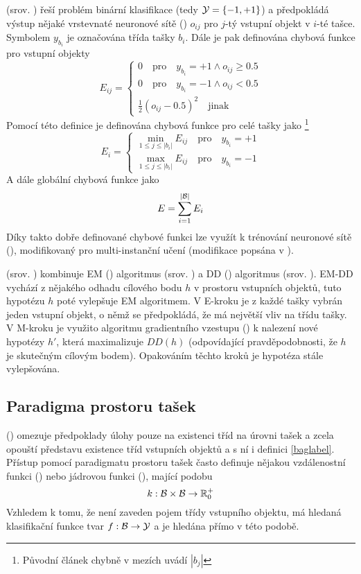  (srov. \cite{zhou_neural_2002}) řeší problém binární klasifikace (tedy \( \mathcal Y = \left\{ -1, +1 \right\} \)) a předpokládá výstup nějaké vrstevnaté neuronové sítě () \( o_{ij} \) pro \(j\)-tý vstupní objekt v \(i\)-té tašce. Symbolem \( y_{b_i} \) je označována třída tašky \( b_i \). Dále je pak definována chybová funkce pro vstupní objekty
\[ E_{ij} = \begin{cases}
	0 \quad \text{pro} \quad y_{b_i} = +1 \land o_{ij} \geq 0.5 \\
	0 \quad \text{pro} \quad y_{b_i} = -1 \land o_{ij} < 0.5 \\
	\frac{1}{2} \left( o_{ij} - 0.5 \right)^2 \quad \text{jinak}
\end{cases} \]
Pomocí této definice je definována chybová funkce pro celé tašky jako \footnote{Původní článek chybně v mezích uvádí \( \left| b_j \right| \)}
\[ E_i = \begin{cases}
	\min_{1 \leq j \leq \left| b_i \right|} E_{ij} \quad \text{pro} \quad y_{b_i} = +1 \\
	\max_{1 \leq j \leq \left| b_i \right|} E_{ij} \quad \text{pro} \quad y_{b_i} = -1
\end{cases} \]
A dále globální chybová funkce jako
\[ E = \sum_{i = 1}^{\left| \mathcal B \right|} E_i \]
Díky takto dobře definované chybové funkci lze využít k trénování neuronové sítě  (), modifikovaný pro multi-instanční učení (modifikace popsána v \cite{zhou_neural_2002}).

 (srov. \cite{zhang_em-dd:_2002}) kombinuje EM () algoritmus (srov. \cite{dempster_maximum_1977}) a DD () algoritmus (srov. \cite{maron_framework_1998}). EM-DD vychází z nějakého odhadu cílového bodu \( h \) v prostoru vstupních objektů, tuto hypotézu \( h \) poté vylepšuje EM algoritmem. V E-kroku je z každé tašky vybrán jeden vstupní objekt, o němž se předpokládá, že má největší vliv na třídu tašky. V M-kroku je využito algoritmu gradientního vzestupu () k nalezení nové hypotézy \( h' \), která maximalizuje \( DD \left( h \right) \) (odpovídající pravděpodobnosti, že \( h \) je skutečným cílovým bodem). Opakováním těchto kroků je hypotéza stále vylepšována.


\subsection{Paradigma prostoru tašek}
 () omezuje předpoklady úlohy  pouze na existenci tříd na úrovni tašek a zcela opouští představu existence tříd vstupních objektů a s ní i definici \ref{baglabel}. Přístup pomocí paradigmatu prostoru tašek často definuje nějakou vzdálenostní funkci () nebo jádrovou funkci (), mající podobu
\[ k : \mathcal B \times \mathcal B \to \mathbb R_0^+ \]
Vzhledem k tomu, že není zaveden pojem třídy vstupního objektu, má hledaná klasifikační funkce tvar \( f : \mathcal B \to \mathcal Y \) a je hledána přímo v této podobě.


